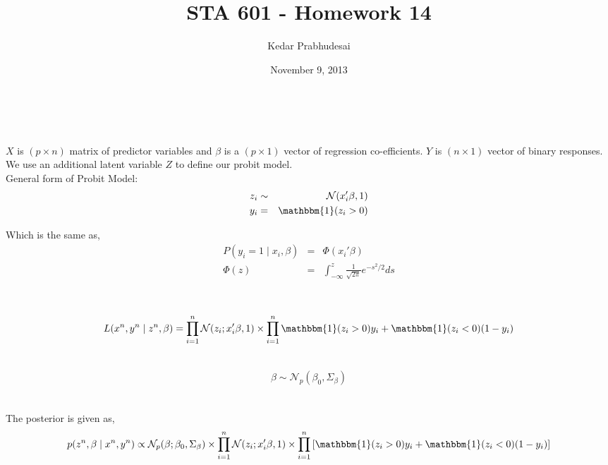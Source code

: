 \documentclass{article}
\title{STA 601 - Homework 14}
\author{Kedar Prabhudesai}
\date{November 9, 2013}
\begin{document}
\maketitle

\\

\\

$X$ is $(p \times n)$ matrix of predictor variables and $\beta$ is a $(p \times 1)$ vector of regression co-efficients. $Y$ is $(n \times 1)$ vector of binary responses. We use an additional latent variable $Z$ to define our probit model.\\

General form of Probit Model:
\begin{eqnarray*}
z_i &\sim& \mathcal{N}(x_i'\beta,1)\\
y_i &=& \mathbbm{1}(z_i > 0)\\
\end{eqnarray*}

Which is the same as,
\begin{eqnarray*}
P(y_i = 1 \mid x_i,\beta) &=& \Phi(x_i'\beta)\\
\Phi(z) &=& \int_{-\infty}^z{\frac{1}{\sqrt{2\pi}}e^{-s^2/2}ds}\\
\end{eqnarray*}

\\
\begin{eqnarray*}
L(x^n,y^n \mid z^n,\beta) = \prod_{i=1}^n{\mathcal{N}(z_i;x_i'\beta,1)} \times \prod_{i=1}^n{\mathbbm{1}(z_i > 0)y_i + \mathbbm{1}(z_i < 0)(1-y_i)}
\end{eqnarray*}

\\
\begin{eqnarray*}
\beta \sim \mathcal{N}_p(\beta_0,\Sigma_{\beta})
\end{eqnarray*}

\\

The posterior is given as,
\begin{eqnarray*}
p(z^n,\beta \mid x^n,y^n) \propto \mathcal{N}_p(\beta;\beta_0,\Sigma_{\beta}) \times \prod_{i=1}^n{\mathcal{N}(z_i;x_i'\beta,1)} \times \prod_{i=1}^n{\left[\mathbbm{1}(z_i > 0)y_i + \mathbbm{1}(z_i < 0)(1-y_i)\right]}
\end{eqnarray*}
\end{document}
